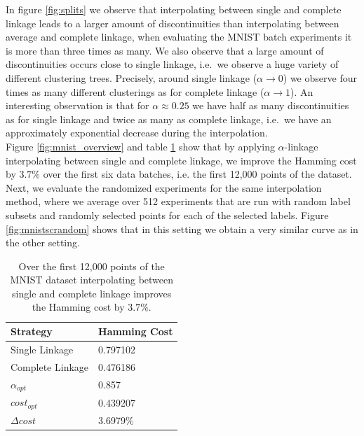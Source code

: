 In figure \ref{fig:splits} we observe that interpolating between single and complete linkage leads to a larger amount of discontinuities than interpolating between average and complete linkage, when evaluating the MNIST batch experiments it is more than three times as many. We also observe that a large amount of discontinuities occurs close to single linkage, i.e.\ we observe a huge variety of different clustering trees. Precisely, around single linkage ($\alpha \rightarrow 0$) we observe four times as many different clusterings as for complete linkage ($\alpha \rightarrow 1$). An interesting observation is that for $\alpha \approx 0.25$ we have half as many discontinuities as for single linkage and twice as many as complete linkage, i.e.\ we have an approximately exponential decrease during the interpolation.\\

Figure \ref{fig:mnist_overview} and table \ref{table:mnist1000avgsc} show that by applying $\alpha$-linkage interpolating between single and complete linkage, we improve the Hamming cost by $3.7\%$ over the first six data batches, i.e. the first 12,000 points of the dataset. Next, we evaluate the randomized experiments for the same interpolation method, where we average over 512 experiments that are run with random label subsets and randomly selected points for each of the selected labels. Figure \ref{fig:mnistscrandom} shows that in this setting we obtain a very similar curve as in the other setting.

\begin{table}[H]
    \centering
    \begin{tabular}{|l | l |}
    \hline
    Strategy & Hamming Cost\\ \hline
    Single Linkage & 0.797102\\
    Complete Linkage & 0.476186\\
    $\alpha_{opt}$ & 0.857\\
    $cost_{opt}$ & 0.439207\\
    $\Delta cost$ & 3.6979\%\\\hline
    \end{tabular}
    \caption{Over the first 12,000 points of the MNIST dataset interpolating between single and complete linkage improves the Hamming cost by $3.7\%$.}
    \label{table:mnist1000avgsc}
\end{table}

